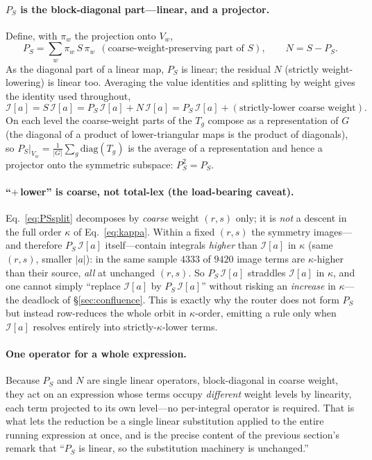 \documentclass[11pt]{article}
\newcommand{\I}[1]{\mathcal{I}[#1]}
\newcommand{\kk}{\kappa}
\begin{document}
\paragraph{$P_S$ is the block-diagonal part---linear, and a projector.}
Define, with $\pi_w$ the projection onto $V_w$,
\begin{equation}
P_S=\sum_w \pi_w\,S\,\pi_w\ \ (\text{coarse-weight-preserving part of }S),\qquad N=S-P_S .
\end{equation}
As the diagonal part of a linear map, $P_S$ is linear; the residual $N$ (strictly
weight-lowering) is linear too. Averaging the value identities and splitting by weight
gives the identity used throughout,
\begin{equation}
\label{eq:PSsplit}
\I{a}=S\,\I{a}=P_S\,\I{a}+N\,\I{a}=P_S\,\I{a}+(\text{strictly-lower coarse weight}).
\end{equation}
On each level the coarse-weight parts of the $T_g$ compose as a representation of $G$
(the diagonal of a product of lower-triangular maps is the product of diagonals), so
$P_S|_{V_w}=\tfrac1{|G|}\sum_g\mathrm{diag}(T_g)$ is the average of a representation and
hence a projector onto the symmetric subspace: $P_S^2=P_S$.

\paragraph{``$+\,$lower'' is coarse, not total-lex (the load-bearing caveat).}
Eq.~\eqref{eq:PSsplit} decomposes by \emph{coarse} weight $(r,s)$ only; it is \emph{not}
a descent in the full order $\kk$ of Eq.~\eqref{eq:kappa}. Within a fixed $(r,s)$ the
symmetry images---and therefore $P_S\,\I{a}$ itself---contain integrals \emph{higher}
than $\I{a}$ in $\kk$ (same $(r,s)$, smaller $|a|$): in the same sample $4333$ of $9420$
image terms are $\kk$-higher than their source, \emph{all} at unchanged $(r,s)$. So
$P_S\,\I{a}$ straddles $\I{a}$ in $\kk$, and one cannot simply ``replace $\I{a}$ by
$P_S\,\I{a}$'' without risking an \emph{increase} in $\kk$---the deadlock of
\S\ref{sec:confluence}. This is exactly why the router does not form $P_S$ but instead
row-reduces the whole orbit in $\kk$-order, emitting a rule only when $\I{a}$ resolves
entirely into strictly-$\kk$-lower terms.

\paragraph{One operator for a whole expression.}
Because $P_S$ and $N$ are single linear operators, block-diagonal in coarse weight, they
act on an expression whose terms occupy \emph{different} weight levels by linearity,
each term projected to its own level---no per-integral operator is required. That is
what lets the reduction be a single linear substitution applied to the entire running
expression at once, and is the precise content of the previous section's remark that
``$P_S$ is linear, so the substitution machinery is unchanged.''
\end{document}
